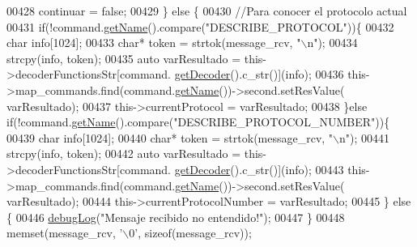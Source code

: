 \begin{DoxyCode}
{{{{{{{{{{{{{00428                             continuar = \textcolor{keyword}{false};
00429                         \} \textcolor{keywordflow}{else} \{
00430                             \textcolor{comment}{//Para conocer el protocolo actual}
00431                             \textcolor{keywordflow}{if}(!command.\hyperlink{classCommands_adf3d8a96310b1f4e57a6ecf0f2f153ea}{getName}().compare(\textcolor{stringliteral}{"DESCRIBE\_PROTOCOL"}))\{
00432                                 \textcolor{keywordtype}{char} info[1024];
00433                                 \textcolor{keywordtype}{char}* token = strtok(message\_rcv, \textcolor{stringliteral}{"\(\backslash\)n"});
00434                                 strcpy(info, token);
00435                                 \textcolor{keyword}{auto} varResultado = this->decoderFunctionsStr[command.
      \hyperlink{classCommands_a8b4c2a655d8dd3de334338d6684d469c}{getDecoder}().c\_str()](info);
00436                                 this->map\_commands.find(command.\hyperlink{classCommands_adf3d8a96310b1f4e57a6ecf0f2f153ea}{getName}())->second.setResValue(
      varResultado);
00437                                 this->currentProtocol = varResultado;
00438                             \}\textcolor{keywordflow}{else} \textcolor{keywordflow}{if}(!command.\hyperlink{classCommands_adf3d8a96310b1f4e57a6ecf0f2f153ea}{getName}().compare(\textcolor{stringliteral}{"DESCRIBE\_PROTOCOL\_NUMBER"}))\{
00439                                 \textcolor{keywordtype}{char} info[1024];
00440                                 \textcolor{keywordtype}{char}* token = strtok(message\_rcv, \textcolor{stringliteral}{"\(\backslash\)n"});
00441                                 strcpy(info, token);
00442                                 \textcolor{keyword}{auto} varResultado = this->decoderFunctionsStr[command.
      \hyperlink{classCommands_a8b4c2a655d8dd3de334338d6684d469c}{getDecoder}().c\_str()](info);
00443                                 this->map\_commands.find(command.\hyperlink{classCommands_adf3d8a96310b1f4e57a6ecf0f2f153ea}{getName}())->second.setResValue(
      varResultado);
00444                                 this->currentProtocolNumber = varResultado;
00445                             \} \textcolor{keywordflow}{else} \{
00446                                 \hyperlink{debug_8hpp_a55f41cf7b0585224496de3d7adbc101c}{debugLog}(\textcolor{stringliteral}{"Mensaje recibido no entendido!"});
00447                             \}
00448                             memset(message\_rcv, \textcolor{charliteral}{'\(\backslash\)0'}, \textcolor{keyword}{sizeof}(message\_rcv));                         
}}}}}}}}}}}}}
\end{DoxyCode}
